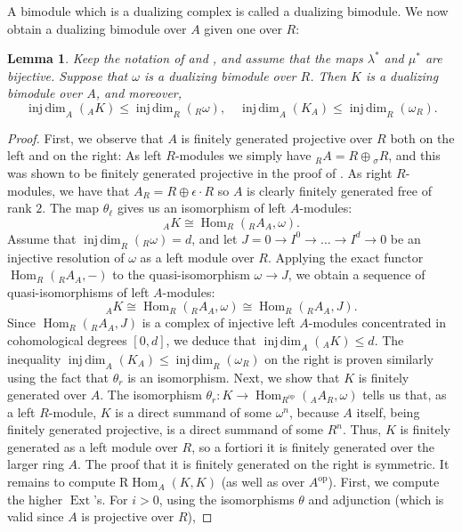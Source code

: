 \documentclass{amsart}
\newtheorem{lem}[equation]{Lemma}
\theoremstyle{definition}
\newcommand{\opn}{\operatorname}
\newcommand{\mrm}[1]{\mathrm{#1}}
\newcommand{\injdim}{\operatorname{inj\,dim}}
\numberwithin{equation}{section}
\begin{document}
A bimodule which is a dualizing complex is called a dualizing bimodule.
We now obtain a dualizing bimodule over $A$ given one over $R$:

\begin{lem}\label{lem:thedualcomp}
Keep the notation of  and ,
and assume that the maps $\lambda^*$ and $\mu^*$ are bijective.
Suppose that $\omega$ is a dualizing bimodule over $R$.
Then $K$ is a dualizing bimodule over $A$,
and moreover,
\[
\injdim_A({}_A K) \le \injdim_R({}_R \omega), \quad
\injdim_A(K_A) \le \injdim_R(\omega_R).
\]
\end{lem}
\begin{proof}
First, we observe that $A$ is finitely generated projective over $R$ both on the left and on the right:
As left $R$-modules we simply have ${}_R A = R \oplus {}_{\sigma} R$,
and this was shown to be finitely generated projective in the proof of .
As right $R$-modules, we have that $A_R = R \oplus \epsilon \cdot R$ so $A$ is clearly finitely generated free of rank $2$.
The map $\theta_{\ell}$ gives us an isomorphism of left $A$-modules:
\[
{}_A K \cong \opn{Hom}_R({}_R A_A ,\omega).
\]
Assume that $\injdim_R({}_R \omega) = d$,
and let $J = 0 \to I^0 \to \dots \to I^d \to 0$ be an injective resolution of $\omega$ as a left module over $R$.
Applying the exact functor $\opn{Hom}_R({}_R A_A,-)$ to the quasi-isomorphism $\omega \to J$, 
we obtain a sequence of quasi-isomorphisms of left $A$-modules:
\[
{}_A K \cong \opn{Hom}_R({}_R A_A ,\omega) \cong \opn{Hom}_R({}_R A_A,J).
\]
Since $\opn{Hom}_R({}_R A_A,J)$ is a complex of injective left $A$-modules concentrated in cohomological degrees $[0,d]$,
we deduce that $\injdim_A({}_A K) \le d$.
The inequality $\injdim_A(K_A) \le \injdim_R(\omega_R)$ on the right is proven similarly using the fact that $\theta_r$ is an isomorphism.
Next, we show that $K$ is finitely generated over $A$.
The isomorphism $\theta_r : K \to \opn{Hom}_{R^{\opn{op}}}({}_A A_R,\omega)$ tells us that, as a left $R$-module, $K$ is a direct summand of some $\omega^n$, because $A$ itself, being finitely generated projective, is a direct summand of some $R^n$.
Thus, $K$ is finitely generated as a left module over $R$,
so a fortiori it is finitely generated over the larger ring $A$.
The proof that it is finitely generated on the right is symmetric.
It remains to compute $\mrm{R}\opn{Hom}_A(K,K)$ (as well as over $A^{\opn{op}}$).
First, we compute the higher $\opn{Ext}$'s.
For $i > 0$,
using the isomorphisms $\theta$ and adjunction (which is valid since $A$ is projective over $R$),

\end{proof}
\end{document}
